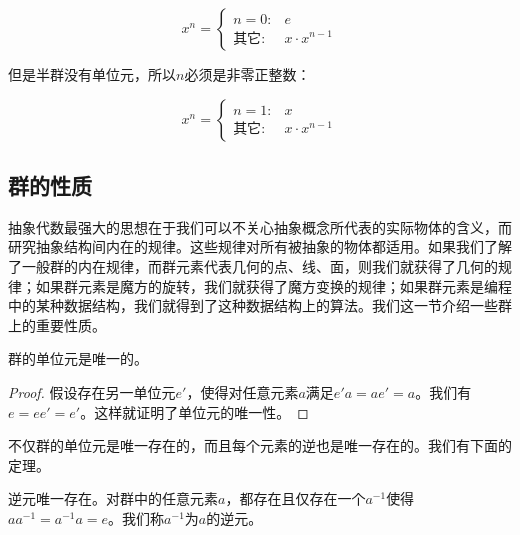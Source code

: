 \documentclass[b5paper]{ctexart}
\begin{document}
\[
x^n = \left .
  \begin{cases}
  n = 0 : & e \\
  \text{其它}: & x \cdot x^{n-1}
  \end{cases}
\right .
\]

但是半群没有单位元，所以$n$必须是非零正整数：

\[
x^n = \left .
  \begin{cases}
  n = 1 : & x \\
  \text{其它}: & x \cdot x^{n-1}
  \end{cases}
\right .
\]

\begin{Exercise}
\end{Exercise}

\subsection{群的性质}

抽象代数最强大的思想在于我们可以不关心抽象概念所代表的实际物体的含义，而研究抽象结构间内在的规律。这些规律对所有被抽象的物体都适用。如果我们了解了一般群的内在规律，而群元素代表几何的点、线、面，则我们就获得了几何的规律；如果群元素是魔方的旋转，我们就获得了魔方变换的规律；如果群元素是编程中的某种数据结构，我们就得到了这种数据结构上的算法。我们这一节介绍一些群上的重要性质。

\begin{theorem}
群的单位元是唯一的。
\end{theorem}

\begin{proof}
假设存在另一单位元$e'$，使得对任意元素$a$满足$e'a = ae' = a$。我们有$e = ee'= e'$。这样就证明了单位元的唯一性。
\end{proof}

不仅群的单位元是唯一存在的，而且每个元素的逆也是唯一存在的。我们有下面的定理。

\begin{theorem}
逆元唯一存在。对群中的任意元素$a$，都存在且仅存在一个$a^{-1}$使得$aa^{-1} = a^{-1}a = e$。我们称$a^{-1}$为$a$的逆元。
\end{theorem}
\end{document}
